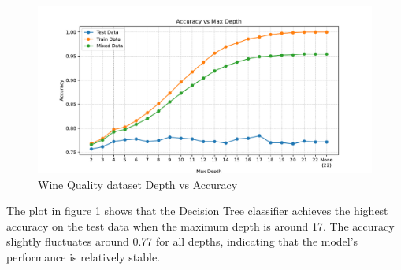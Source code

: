 \begin{figure}[H]
    \centering
    \includegraphics[width=\textwidth]{figures/wine_quality_accuracy_vs_max_depth.pdf}
    \caption{Wine Quality dataset Depth vs Accuracy}
    \label{fig:wine_quality_accuracy_vs_max_depth}
\end{figure}

The plot in figure \ref{fig:wine_quality_accuracy_vs_max_depth} shows that the Decision Tree classifier achieves the highest accuracy on the test data when the maximum depth is around 17. The accuracy slightly fluctuates around 0.77 for all depths, indicating that the model's performance is relatively stable.

